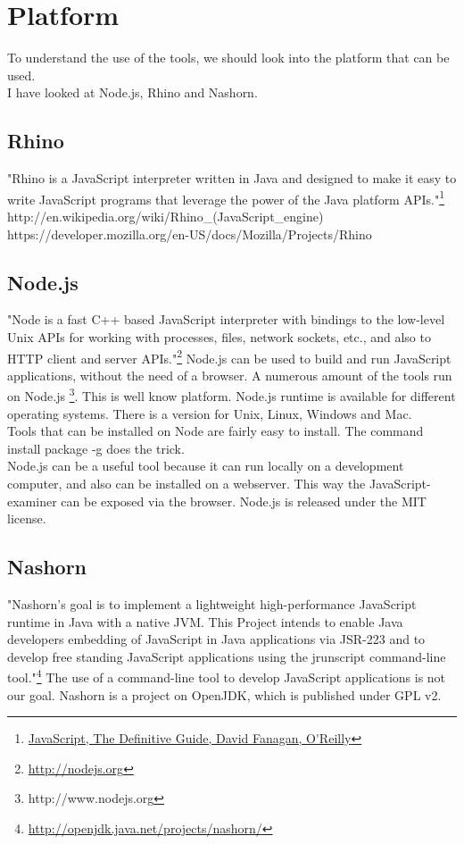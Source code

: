 \documentclass{article}
\begin{document}
\section{Platform}
To understand the use of the tools, we should look into the platform that can be used.\\
I have looked at Node.js, Rhino and Nashorn.

\subsection{Rhino}
"Rhino is a JavaScript interpreter written in Java and designed to make it easy to write JavaScript programs 
that leverage the power of the Java platform APIs."\footnote{\url{JavaScript, The Definitive Guide, David Fanagan, O'Reilly}}\newline
http://en.wikipedia.org/wiki/Rhino\_(JavaScript\_engine)
https://developer.mozilla.org/en-US/docs/Mozilla/Projects/Rhino

\subsection{Node.js}
"Node is a fast C++ based JavaScript interpreter with bindings to the low-level 
Unix APIs for working with processes, files, network sockets, etc., and also to 
HTTP client and server APIs."\footnote{\url{http://nodejs.org}}
Node.js can be used to build and run JavaScript applications, without the need of a browser.
A numerous amount of the tools run on Node.js \footnote{http://www.nodejs.org}. This is well know platform.
Node.js runtime is available for different operating systems.
There is a version for Unix, Linux, Windows and Mac.\\
Tools that can be installed on Node are fairly easy to install. The command install package -g does the trick.\\
Node.js can be a useful tool because it can run locally on a development computer, and also can be installed on a webserver.
This way the JavaScript-examiner can be exposed via the browser.
Node.js is released under the MIT license.

\subsection{Nashorn}
"Nashorn's goal is to implement a lightweight high-performance JavaScript runtime in Java with a native JVM.
This Project intends to enable Java developers embedding of JavaScript in Java applications via JSR-223 and to develop 
free standing JavaScript applications using the jrunscript command-line tool."\footnote{\url{http://openjdk.java.net/projects/nashorn/}}
The use of a command-line tool to develop JavaScript applications is not our goal.
Nashorn is a project on OpenJDK, which is published under GPL v2.
\end{document}
